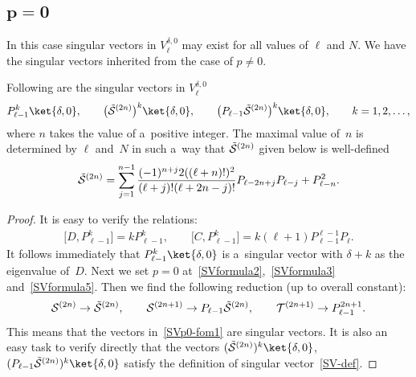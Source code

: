 \documentclass[pdftex]{sigma}
\numberwithin{equation}{section}
\begin{document}
\subsection[$p=0$]{$\boldsymbol{p=0}$}

In this case singular vectors in $ V^{\delta,0}_{\ell} $ may exist for all values of $\ell $ and $ N$.
We have the singular vectors inherited from the case of $ p \neq 0$.
\begin{proposition}
\label{prop5}
Following are the singular vectors in $ V^{\delta,0}_{\ell}$
\begin{gather}
P_{\ell-1}^k \ket{\delta,0},
\qquad
\big(\tilde{\cal S}^{(2n)}\big)^k \ket{\delta,0},
\qquad
\big(P_{\ell-1} \tilde{\cal S}^{(2n)}\big)^k \ket{\delta,0},
\qquad
k = 1, 2, \dots,
\label{SVp0-fom1}
\end{gather}
where $ n $ takes the value of a~positive integer.
The maximal value of~$n$ is determined by $ \ell $ and~$N$ in such a~way that $ \tilde{\cal S}^{(2n)} $ given below is
well-defined
\begin{gather*}
\tilde{\cal S}^{(2n)} = \sum\limits_{j=1}^{n-1} \frac{(-1)^{n+j}  2  ((\ell+n)!)^2}{(\ell+j)!  (\ell+2n-j)!}
P_{\ell-2n+j}  P_{\ell-j} + P_{\ell-n}^2.
\end{gather*}
\end{proposition}

\begin{proof}
It is easy to verify the relations:
\begin{gather*}
\big[D, P_{\ell-1}^k\big] = k  P_{\ell-1}^k,
\qquad
\big[C, P_{\ell-1}^k\big] = k  (\ell+1)  P_{\ell-1}^{\ell-1}  P_{\ell}.
\end{gather*}
It follows immediately that $ P_{\ell-1}^k \ket{\delta,0} $ is a~singular vector with $ \delta + k $ as the eigenvalue
of~$D$.
Next we set $ p = 0 $ at~\eqref{SVformula2},~\eqref{SVformula3} and~\eqref{SVformula5}.
Then we f\/ind the following reduction (up to overall constant):
\begin{gather*}
{\cal S}^{(2n)}  \to \tilde{\cal S}^{(2n)},
\qquad
{\cal S}^{(2n+1)} \to P_{\ell-1} \tilde{\cal S}^{(2n)},
\qquad
{\cal T}^{(2n+1)} \to P_{\ell-1}^{2n+1}.
\end{gather*}
This means that the vectors in~\eqref{SVp0-fom1} are singular vectors.
It is also an easy task to verify directly that the vectors $ (\tilde{\cal S}^{(2n)})^k \ket{\delta,0}$, $(P_{\ell-1}
\tilde{\cal S}^{(2n)})^k \ket{\delta,0} $ satisfy the def\/inition of singular vec\-tor~\eqref{SV-def}.
\end{proof}
\end{document}
